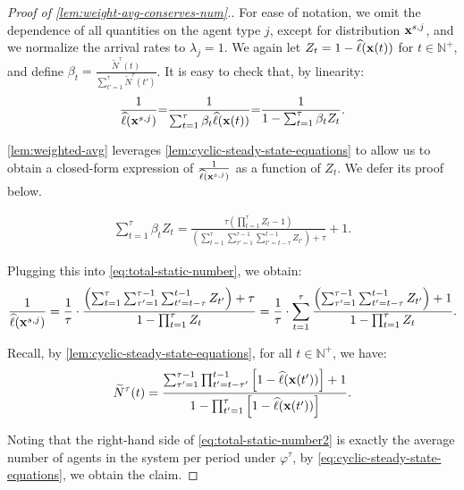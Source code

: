 \documentclass[12pt]{article}
\begin{document}
\begin{proof}[Proof of \cref{lem:weight-avg-conserves-num}.]
For ease of notation, we omit the dependence of all quantities on the agent type $j$, except for distribution $\mathbf{x}^{s,j}$, and we normalize the arrival rates to $\lambda_j = 1$. {We again} let $Z_t = 1-\widehat{\ell}(\mathbf{x}(t))$ for $t \in \mathbb{N}^+$, and define $\beta_t = \frac{\widetilde{N}^\tau(t)}{\sum_{t'=1}^\tau \widetilde{N}^\tau(t')}$. %
It is easy to check that, by linearity:
\begin{align}\label{eq:total-static-number}
 \frac{1}{\widehat{\ell}(\mathbf{x}^{s,j})}{=} \frac{1}{\sum_{t=1}^\tau \beta_t \widehat{\ell}(\mathbf{x}(t))} {=} \frac{1}{1-\sum_{t=1}^\tau \beta_t Z_t}.
\end{align}

\cref{lem:weighted-avg} leverages \cref{lem:cyclic-steady-state-equations} to allow us to obtain a closed-form expression of $\frac{1}{\widehat{\ell}(\mathbf{x}^{s,j})}$ as a function of $Z_t$. We defer its proof below.

\begin{lemma}\label{lem:weighted-avg}
\begin{align*}
    \sum_{t=1}^\tau \beta_tZ_t = \frac{\tau\left(\prod_{t=1}^\tau Z_t - 1\right)}{\left(\sum_{t=1}^\tau \sum_{\tau'=1}^{\tau-1}\sum_{t'=t-\tau}^{t-1}Z_{t'} \right) + \tau } + 1.
\end{align*}
\end{lemma}

Plugging this into \eqref{eq:total-static-number}, we obtain:
\begin{align}\label{eq:total-static-number2}
\frac{1}{\widehat{\ell}(\mathbf{x}^{s,j})} = \frac1\tau \cdot \frac{\left(\sum_{t=1}^\tau \sum_{\tau'=1}^{\tau-1}\sum_{t'=t-\tau}^{t-1}Z_{t'} \right) + \tau }{1-\prod_{t=1}^\tau Z_t} = \frac1\tau\cdot \sum_{t=1}^\tau \frac{\left(\sum_{\tau'=1}^{\tau-1}\sum_{t'=t-\tau}^{t-1}Z_{t'}\right)  + 1}{{1-\prod_{t=1}^\tau Z_t} }.
\end{align}

Recall, by \cref{lem:cyclic-steady-state-equations}, for all {$t \in \mathbb{N}^+$}, we have:
\begin{align}\label{eq:cyclic-steady-state-equations}
    \widetilde{N}^\tau(t) = \frac{\sum_{\tau' = 1}^{\tau-1} \prod_{t'=t-\tau'}^{t-1}\left[1-\widehat{\ell}(\mathbf{x}(t'))\right] + 1}{1-\prod_{t'=1}^\tau \left[1-\widehat{\ell}(\mathbf{x}(t'))\right]}.
\end{align}

Noting that the right-hand side of \eqref{eq:total-static-number2} is exactly the average number of agents in the system per period under $\varphi^\tau$, by \eqref{eq:cyclic-steady-state-equations}, we obtain the claim.
\end{proof}
\end{document}
